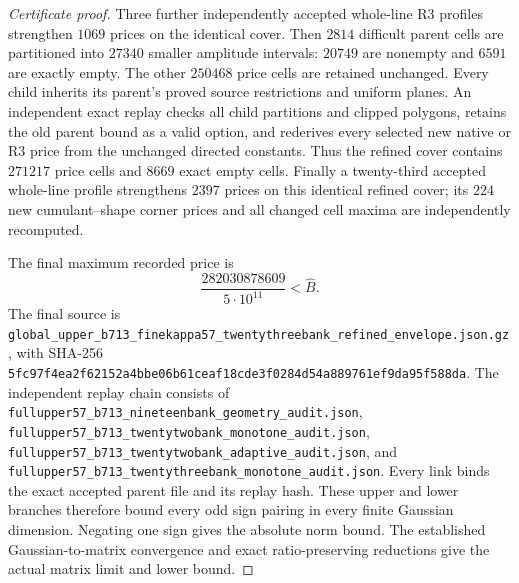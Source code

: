 \begin{proof}[Certificate proof]
Three further independently accepted whole-line R3 profiles strengthen
$1069$ prices on the identical cover. Then $2814$ difficult parent cells
are partitioned into $27340$ smaller amplitude intervals: $20749$ are
nonempty and $6591$ are exactly empty. The other $250468$ price cells
are retained unchanged. Every child inherits its parent's proved source
restrictions and uniform planes. An independent exact replay checks
all child partitions and clipped polygons, retains the old parent bound
as a valid option, and rederives every selected new native or R3 price
from the unchanged directed constants. Thus the refined cover contains
$271217$ price cells and $8669$ exact empty cells. Finally a twenty-third
accepted whole-line profile strengthens $2397$ prices on this identical
refined cover; its $224$ new cumulant--shape corner prices and all changed
cell maxima are independently recomputed.

The final maximum recorded price is
\[
 \frac{282030878609}{5\cdot10^{11}}<\widehat B.
\]
The final source is
\texttt{global\_\allowbreak upper\_\allowbreak b713\_\allowbreak finekappa57\_\allowbreak twentythreebank\_\allowbreak refined\_\allowbreak envelope.json.gz},
with SHA-256
\texttt{\allowbreak 5fc97f4ea2f62152a4bbe06b61ceaf18cde3f0284d54a889761ef9da95f588da}.
The independent replay chain consists of
\texttt{fullupper57\_\allowbreak b713\_\allowbreak nineteenbank\_\allowbreak geometry\_\allowbreak audit.json},
\texttt{fullupper57\_\allowbreak b713\_\allowbreak twentytwobank\_\allowbreak monotone\_\allowbreak audit.json},
\texttt{fullupper57\_\allowbreak b713\_\allowbreak twentytwobank\_\allowbreak adaptive\_\allowbreak audit.json}, and
\texttt{fullupper57\_\allowbreak b713\_\allowbreak twentythreebank\_\allowbreak monotone\_\allowbreak audit.json}.
Every link binds the exact accepted parent file and its replay hash.
These upper and lower branches therefore bound every odd sign pairing
in every finite Gaussian dimension. Negating one sign gives the absolute
norm bound. The established Gaussian-to-matrix convergence and exact
ratio-preserving reductions give the actual matrix limit and lower bound.
\end{proof}
